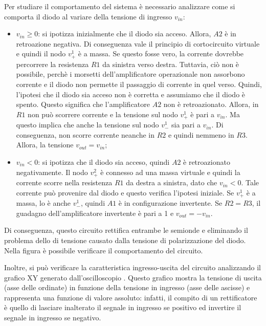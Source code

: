 \noindent
Per studiare il comportamento del sistema è necessario analizzare come si comporta il diodo al variare della tensione di ingresso $v_{in}$:
\begin{itemize}
	\item $v_{in} \geq 0$: si ipotizza inizialmente che il diodo sia acceso. Allora, $A2$  è in retroazione negativa. Di conseguenza vale il principio di cortocircuito virtuale e quindi il nodo $v_{+}^1$ è a massa. Se questo fosse vero, la corrente dovrebbe percorrere la resistenza $R1$ da sinistra verso destra. Tuttavia, ciò non è possibile, perchè i morsetti dell'amplificatore operazionale non assorbono corrente e il diodo non permette il passaggio di corrente in quel verso. Quindi, l'ipotesi che il diodo sia acceso non è corretta e assumiamo che il diodo è spento. Questo significa che l'amplificatore $A2$ non è retroazionato. Allora, in $R1$ non può scorrere corrente e la tensione sul nodo $v_{+}^1$ è pari a $v_{in}$. Ma questo implica che anche la tensione sul nodo $v_{-}^1$ sia pari a $v_{in}$. Di conseguenza, non scorre corrente neanche in $R2$ e quindi nemmeno in $R3$. Allora, la tensione $v_{out} = v_{in}$;
	\item $v_{in} < 0$: si ipotizza che il diodo sia acceso, quindi $A2$ è retroazionato negativamente. Il nodo $v_{+}^2$ è connesso ad una massa virtuale e quindi la corrente scorre nella resistenza $R1$ da destra a sinistra, dato che $v_{in} < 0$. Tale corrente può provenire dal diodo e questo verifica l'ipotesi iniziale. Se $v_{+}^1$ è a massa, lo è anche $v_{-}^1$, quindi $A1$ è in configurazione invertente. Se $R2 = R3$, il guadagno dell'amplificatore invertente è pari a 1 e $v_{out} = -v_{in}$.
\end{itemize}
Di conseguenza, questo circuito rettifica entrambe le semionde e eliminando il problema dello  di tensione causato dalla tensione di polarizzazione del diodo. Nella figura  è possibile verificare il comportamento del circuito.


\noindent
Inoltre, si può verificare la caratteristica ingresso-uscita del circuito analizzando il grafico XY generato dall'oscilloscopio . Questo grafico mostra la tensione di uscita (asse delle ordinate) in funzione della tensione in ingresso (asse delle ascisse) e rappresenta una funzione di valore assoluto: infatti, il compito di un rettificatore è quello di lasciare inalterato il segnale in ingresso se positivo ed invertire il segnale in ingresso se negativo.

